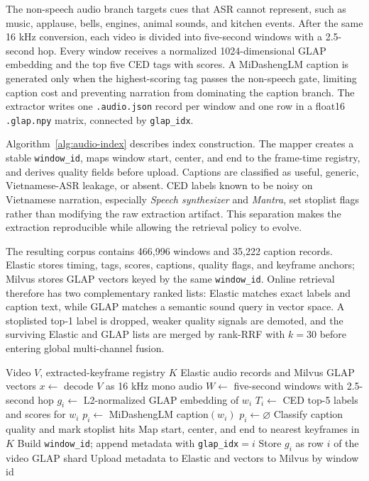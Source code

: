 \documentclass[conference]{IEEEtran}
\newcommand{\field}[1]{\nolinkurl{#1}}
\begin{document}
The non-speech audio branch targets cues that ASR cannot represent, such as
music, applause, bells, engines, animal sounds, and kitchen events. After the
same 16 kHz conversion, each video is divided into five-second windows with a
2.5-second hop. Every window receives a normalized 1024-dimensional GLAP
embedding \cite{dinkel2025glap} and the top five CED tags
\cite{dinkel2023ced} with scores. A MiDashengLM caption
\cite{dinkel2025midashenglm} is generated only when the highest-scoring tag passes the
non-speech gate, limiting caption cost and preventing narration from dominating
the caption branch. The extractor writes one \texttt{.audio.json} record per
window and one row in a float16 \texttt{.glap.npy} matrix, connected by
\field{glap_idx}.

Algorithm~\ref{alg:audio-index} describes index construction. The mapper creates
a stable \field{window_id}, maps window start, center, and end to the frame-time
registry, and derives quality fields before upload. Captions are classified as
useful, generic, Vietnamese-ASR leakage, or absent. CED labels known to be noisy
on Vietnamese narration, especially \emph{Speech synthesizer} and
\emph{Mantra}, set stoplist flags rather than modifying the raw extraction
artifact. This separation makes the extraction reproducible while allowing the
retrieval policy to evolve.

The resulting corpus contains 466,996 windows and 35,222 caption records.
Elastic stores timing, tags, scores, captions, quality flags, and keyframe
anchors; Milvus stores GLAP vectors keyed by the same \field{window_id}. Online
retrieval therefore has two complementary ranked lists: Elastic matches exact
labels and caption text, while GLAP matches a semantic sound query in vector
space. A stoplisted top-1 label is dropped, weaker quality signals are demoted,
and the surviving Elastic and GLAP lists are merged by rank-RRF with $k=30$
before entering global multi-channel fusion.

\begin{algorithm}[!t]
\caption{Audio-event index construction}
\label{alg:audio-index}
\footnotesize
\begin{algorithmic}[1]
\Require Video $V$, extracted-keyframe registry $K$
\Ensure Elastic audio records and Milvus GLAP vectors
\State $x \gets$ decode $V$ as 16 kHz mono audio
\State $W \gets$ five-second windows with 2.5-second hop
  \State $g_i \gets$ L2-normalized GLAP embedding of $w_i$
  \State $T_i \gets$ CED top-5 labels and scores for $w_i$
    \State $p_i \gets$ MiDashengLM caption$(w_i)$
  \Else
    \State $p_i \gets \varnothing$
  \EndIf
  \State Classify caption quality and mark stoplist hits
  \State Map start, center, and end to nearest keyframes in $K$
  \State Build \texttt{window\_id}; append metadata with \texttt{glap\_idx}$=i$
  \State Store $g_i$ as row $i$ of the video GLAP shard
\EndFor
\State Upload metadata to Elastic and vectors to Milvus by window id
\end{algorithmic}
\end{algorithm}
\end{document}
